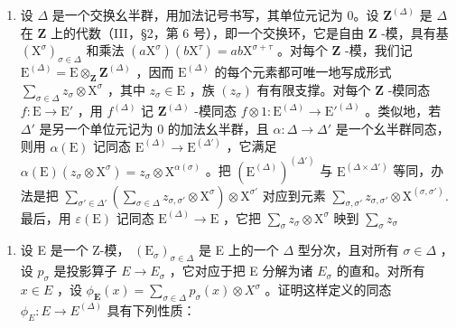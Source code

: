 \BourbakiExercisesSection

\begin{enumerate}
\def\labelenumi{\arabic{enumi}.}
\tightlist
\item
  设 \(\Delta\) 是一个交换幺半群，用加法记号书写，其单位元记为 0。设 \(\mathbf{Z}^{(\Delta)}\) 是 \(\Delta\) 在 \(\mathbf{Z}\) 上的代数（III，§2，第 6 号），即一个交换环，它是自由 \(\mathbf{Z}\) -模，具有基 \((\mathrm{X}^{\sigma})_{\sigma \in \Delta}\) 和乘法 \((a\mathrm{X}^{\sigma})(b\mathrm{X}^{\tau}) = ab\mathrm{X}^{\sigma +\tau}\) 。对每个 \(\mathbf{Z}\) -模，我们记 \(\mathrm{E}^{(\Delta)} = \mathrm{E} \otimes_{\mathbf{Z}} \mathbf{Z}^{(\Delta)}\) ，因而 \(\mathrm{E}^{(\Delta)}\) 的每个元素都可唯一地写成形式 \(\sum_{\sigma \in \Delta} z_{\sigma} \otimes \mathrm{X}^{\sigma}\) ，其中 \(z_{\sigma} \in \mathrm{E}\) ，族 \((z_{\sigma})\) 有有限支撑。对每个 \(\mathbf{Z}\) -模同态 \(f: \mathrm{E} \to \mathrm{E}'\) ，用 \(f^{(\Delta)}\) 记 \(\mathbf{Z}^{(\Delta)}\) -模同态 \(f \otimes 1: \mathrm{E}^{(\Delta)} \to \mathrm{E}'^{(\Delta)}\) 。类似地，若 \(\Delta'\) 是另一个单位元记为 0 的加法幺半群，且 \(\alpha: \Delta \to \Delta'\) 是一个幺半群同态，则用 \(\alpha(\mathrm{E})\) 记同态 \(\mathrm{E}^{(\Delta)} \to \mathrm{E}^{(\Delta')}\) ，它满足 \(\alpha(\mathrm{E})(z_{\sigma} \otimes \mathrm{X}^{\sigma}) = z_{\sigma} \otimes \mathrm{X}^{\alpha(\sigma)}\) 。把 \((\mathrm{E}^{(\Delta)})^{(\Delta')}\) 与 \(\mathrm{E}^{(\Delta \times \Delta')}\) 等同，办法是把 \(\sum_{\sigma' \in \Delta'} \left( \sum_{\sigma \in \Delta} z_{\sigma, \sigma'} \otimes \mathrm{X}^{\sigma} \right) \otimes \mathrm{X}^{\sigma'}\) 对应到元素 \(\sum_{\sigma, \sigma'} z_{\sigma, \sigma'} \otimes \mathrm{X}^{(\sigma, \sigma')}.\) 最后，用 \(\varepsilon(\mathrm{E})\) 记同态 \(\mathrm{E}^{(\Delta)} \to \mathrm{E}\) ，它把 \(\sum_{\sigma} z_{\sigma} \otimes \mathrm{X}^{\sigma}\) 映到 \(\sum_{\sigma} z_{\sigma}\)
\end{enumerate}

\begin{enumerate}
\def\labelenumi{(\alph{enumi})}
\tightlist
\item
  设 E 是一个 Z-模， \((\mathrm{E}_{\sigma})_{\sigma\in\Delta}\) 是 E 上的一个 \(\Delta\) 型分次，且对所有 \(\sigma\in\Delta\) ，设 \(p_{\sigma}\) 是投影算子 \(E\to E_{\sigma}\) ，它对应于把 E 分解为诸 \(E_{\sigma}\) 的直和。对所有 \(x\in E\) ，设 \(\phi_{\mathbf{E}}(x)=\sum_{\sigma\in\Delta}p_{\sigma}(x)\otimes X^{\sigma}\) 。证明这样定义的同态 \(\phi_{E}\colon E\to E^{(\Delta)}\) 具有下列性质：
\end{enumerate}

